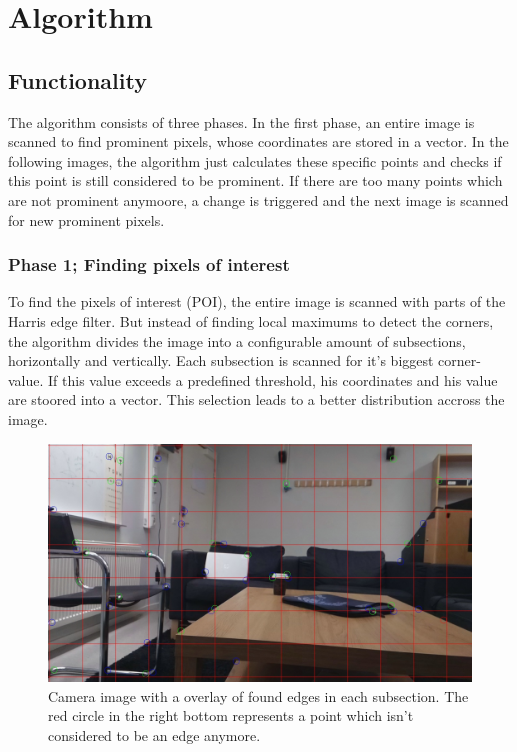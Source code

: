 \chapter{Algorithm }
\section{Functionality}
The algorithm consists of three phases. In the first phase, an entire image is scanned to find prominent pixels, whose coordinates are stored in a vector. In the following images, the algorithm just calculates these specific points and checks if this point is still considered to be prominent. If there are too many points which are not prominent anymoore, a change is triggered and the next image is scanned for new prominent pixels. 

\subsection{Phase 1; Finding pixels of interest}
To find the pixels of interest (POI), the entire image is scanned with parts of the Harris edge filter.  But instead of finding local maximums to detect the corners, the algorithm divides the image into a configurable amount of subsections, horizontally and vertically. Each subsection is scanned for it's biggest corner-value. If this value exceeds a predefined threshold, his coordinates and his value are stoored into a vector. This selection leads to a better distribution accross the image. 

\begin{figure}[h!]
	\centering
	\includegraphics[width=0.9\linewidth]{bin/hotspots}
	\caption{Camera image with a overlay of found edges in each subsection. The red circle in the right bottom represents a point which isn't considered to be an edge anymore. }
	\label{fig:hotspots}
\end{figure} 



